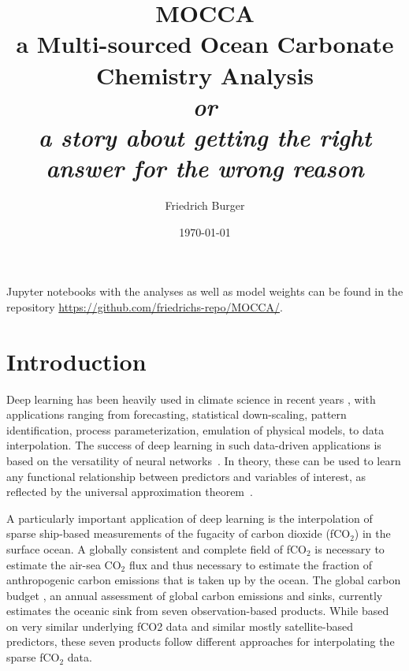 \documentclass{article}
\title{\textbf{MOCCA} \\[0.25cm]
\large a Multi-sourced Ocean Carbonate Chemistry Analysis \\[1cm]
\textit{or} \\[0.25cm]
\textit{a story about getting the right answer for the wrong reason}}
\author{Friedrich Burger}
\date{\today}
\begin{document}
	
	\maketitle
	
	\vspace{10cm}
	Jupyter notebooks with the analyses as well as model weights can be found in the repository \url{https://github.com/friedrichs-repo/MOCCA/}.
	
	
	\newpage
	
	\tableofcontents
	\section{Introduction}
	Deep learning has been heavily used in climate science in recent years \citep{reichstein2019}, with applications ranging from forecasting, statistical down-scaling, pattern identification, process parameterization, emulation of physical models, to data interpolation. The success of deep learning in such data-driven applications is based on the versatility of neural networks~\cite{goodfellow2016}. In theory, these can be used to learn any functional relationship between predictors and variables of interest, as reflected by the universal approximation theorem~\cite{hornik1989}.
	
	A particularly important application of deep learning is the interpolation of sparse ship-based measurements of the fugacity of carbon dioxide (fCO$_2$) in the surface ocean. A globally consistent and complete field of fCO$_2$ is necessary to estimate the air-sea CO$_2$ flux and thus necessary to estimate the fraction of anthropogenic carbon emissions that is taken up by the ocean. The global carbon budget \citep{friedlingstein2023}, an annual assessment of global carbon emissions and sinks, currently estimates the oceanic sink from seven observation-based products. While based on very similar underlying fCO2 data and similar mostly satellite-based predictors, these seven products follow different approaches for interpolating the sparse fCO$_2$ data. 
	
\end{document}
